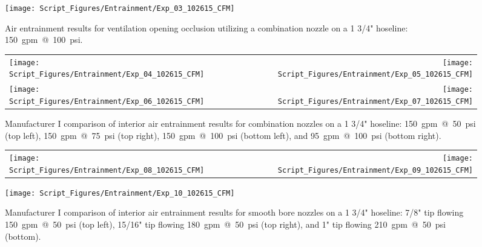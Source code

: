 \documentclass[12pt,oneside]{book}
\begin{document}
\begin{figure}[!ht]
\centering
\texttt{[image: Script\_Figures/Entrainment/Exp\_03\_102615\_CFM]}
\caption[Air Entrainment Results Varying Ventilation Opening Occlusion]{Air entrainment results for ventilation opening occlusion utilizing a combination nozzle on a 1 3/4" hoseline: 150~gpm~@~100~psi.}
\label{fig:Opening_Occlusion}
\end{figure}

\clearpage

\begin{figure}[!ht]
\begin{tabular*}{\textwidth}{lr}
\texttt{[image: Script\_Figures/Entrainment/Exp\_04\_102615\_CFM]} &
\texttt{[image: Script\_Figures/Entrainment/Exp\_05\_102615\_CFM]} \\
\texttt{[image: Script\_Figures/Entrainment/Exp\_06\_102615\_CFM]} &
\texttt{[image: Script\_Figures/Entrainment/Exp\_07\_102615\_CFM]} \\
\end{tabular*}
\caption[Manufacturer I Air Entrainment from Combination Nozzle Varying Pressure and Flowrate]{Manufacturer I comparison of interior air entrainment results for combination nozzles on a 1 3/4" hoseline: 150~gpm~@~50~psi (top left), 150~gpm~@~75~psi (top right), 150~gpm~@~100~psi (bottom left), and 95~gpm~@~100~psi (bottom right).}
\label{fig:1_5_Interior_Combination_Manufacturer_I}
\end{figure}

\clearpage

\begin{figure}[!ht]
\begin{tabular*}{\textwidth}{lr}
\texttt{[image: Script\_Figures/Entrainment/Exp\_08\_102615\_CFM]} &
\texttt{[image: Script\_Figures/Entrainment/Exp\_09\_102615\_CFM]} \\
\end{tabular*}
\centering
\texttt{[image: Script\_Figures/Entrainment/Exp\_10\_102615\_CFM]} 
\caption[Manufacturer I Air Entrainment from Smooth Bore Nozzle Varying Pressure and Flowrate]{Manufacturer I comparison of interior air entrainment results for smooth bore nozzles on a 1 3/4" hoseline: 7/8" tip flowing 150~gpm~@~50~psi (top left), 15/16" tip flowing 180~gpm~@~50~psi (top right), and 1" tip flowing 210~gpm~@~50~psi (bottom).}
\label{fig:1_5_Interior_Smooth_Bore_Manufacturer_I}
\end{figure}

\clearpage
\end{document}
